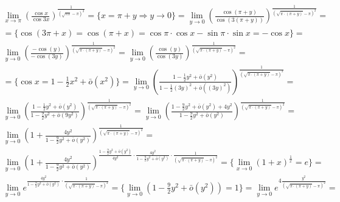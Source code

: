\documentclass[12pt]{article}
\begin{document}
            \begin{gather*}
                \lim_{x \to \pi} \left(\frac{\cos{x}}{\cos{3x}}\right)^{\frac{1}{(\sqrt{\pi x} - \pi)^2}} =
                \{x = \pi + y \Rightarrow y \to 0\} =
                \lim_{y \to 0} \left(\frac{\cos(\pi + y)}{\cos(3(\pi + y))}\right)^{\frac{1}{(\sqrt{\pi \cdot (\pi + y)} - \pi)^2}} =\\
                = \{\cos(3\pi + x) = \cos(\pi + x) = \cos{\pi} \cdot \cos{x} - \sin{\pi} \cdot \sin{x} = -\cos{x}\} =\\
                \lim_{y \to 0} \left(\frac{-\cos(y)}{-\cos(3y)}\right)^{\frac{1}{(\sqrt{\pi \cdot (\pi + y)} - \pi)^2}} =
                \lim_{y \to 0} \left(\frac{\cos(y)}{\cos(3y)}\right)^{\frac{1}{(\sqrt{\pi \cdot (\pi + y)} - \pi)^2}} =\\
                = \{\cos{x} = 1 - \frac{1}{2}x^2 + \bar{o}(x^2)\} =
                \lim_{y \to 0} \left(\frac{1 - \frac{1}{2}y^2 + \bar{o}(y^2)}{1 - \frac{1}{2}(3y)^2 + \bar{o}((3y)^2)}\right)^{\frac{1}{(\sqrt{\pi \cdot (\pi + y)} - \pi)^2}} =\\
                \lim_{y \to 0} \left(\frac{1 - \frac{1}{2}y^2 + \bar{o}(y^2)}{1 - \frac{9}{2}y^2 + \bar{o}(9y^2)}\right)^{\frac{1}{(\sqrt{\pi \cdot (\pi + y)} - \pi)^2}} =
                \lim_{y \to 0} \left(\frac{1 - \frac{9}{2}y^2 + \bar{o}(y^2) + 4y^2}{1 - \frac{9}{2}y^2 + \bar{o}(y^2)}\right)^{\frac{1}{(\sqrt{\pi \cdot (\pi + y)} - \pi)^2}} =\\
                \lim_{y \to 0} \left(1 + \frac{4y^2}{1 - \frac{9}{2}y^2 + \bar{o}(y^2)}\right)^{\frac{1}{(\sqrt{\pi \cdot (\pi + y)} - \pi)^2}} =\\
                \lim_{y \to 0} \left(1 + \frac{4y^2}{1 - \frac{9}{2}y^2 + \bar{o}(y^2)}\right)^{\frac{1-\frac{9}{2}y^2 + \bar{o}(y^2)}{4y^2} \cdot \frac{4y^2}{1-\frac{9}{2}y^2 + \bar{o}(y^2)} \cdot \frac{1}{(\sqrt{\pi \cdot (\pi + y)} - \pi)^2}} =
                \{\lim_{x \to 0} (1 + x)^{\frac{1}{x}} = e\} =\\
                \lim_{y \to 0} e^{\frac{4y^2}{1-\frac{9}{2}y^2 + \bar{o}(y^2)} \cdot \frac{1}{(\sqrt{\pi \cdot (\pi + y)} - \pi)^2}} =
                \{\lim_{y \to 0} \left(1 - \frac{9}{2}y^2 + \bar{o}(y^2)\right) = 1\} =
                \lim_{y \to 0} e^{4\frac{y^2}{(\sqrt{\pi \cdot (\pi + y)} - \pi)^2}} =
            \end{gather*}
            \newpage
\end{document}
